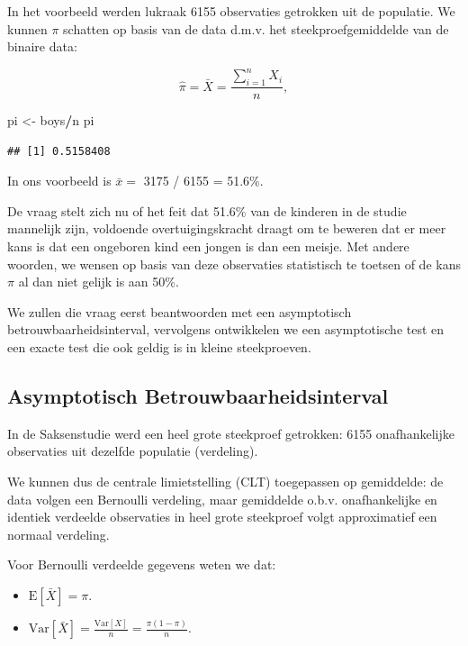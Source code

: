 \documentclass[
  12pt,dutch]{book}
\newenvironment{Shaded}{\begin{snugshade}}{\end{snugshade}}
\newcommand{\NormalTok}[1]{#1}
\newcommand{\OtherTok}[1]{\textcolor[rgb]{0.56,0.35,0.01}{#1}}
\newcommand{\SpecialCharTok}[1]{\textcolor[rgb]{0.81,0.36,0.00}{\textbf{#1}}}
\providecommand{\tightlist}{%
  \setlength{\itemsep}{0pt}\setlength{\parskip}{0pt}}
\theoremstyle{definition}
\theoremstyle{definition}
\theoremstyle{definition}
\theoremstyle{definition}
\theoremstyle{remark}
\begin{document}
In het voorbeeld werden lukraak
6155 observaties getrokken uit de populatie.
We kunnen \(\pi\) schatten op basis van de data d.m.v. het steekproefgemiddelde van de binaire data:

\[\hat \pi = \bar X = \frac{\sum\limits_{i=1}^n X_i}{n},\]

\begin{Shaded}
\begin{Highlighting}[]
\NormalTok{pi }\OtherTok{\textless{}{-}}\NormalTok{ boys}\SpecialCharTok{/}\NormalTok{n}
\NormalTok{pi}
\end{Highlighting}
\end{Shaded}

\begin{verbatim}
## [1] 0.5158408
\end{verbatim}

In ons voorbeeld is \(\bar x =\) 3175 / 6155 = 51.6\%.

De vraag stelt zich nu of het feit dat 51.6\% van de kinderen in de studie mannelijk zijn, voldoende overtuigingskracht draagt om te beweren dat er meer kans is dat een ongeboren kind een jongen is dan een meisje. Met andere woorden, we wensen op basis van deze observaties statistisch te toetsen of de kans \(\pi\) al dan niet gelijk is aan 50\%.

We zullen die vraag eerst beantwoorden met een asymptotisch betrouwbaarheidsinterval, vervolgens ontwikkelen we een asymptotische test en een exacte test die ook geldig is in kleine steekproeven.

\subsection{Asymptotisch Betrouwbaarheidsinterval}\label{asymptotisch-betrouwbaarheidsinterval}

In de Saksenstudie werd een heel grote steekproef getrokken: 6155 onafhankelijke observaties uit dezelfde populatie (verdeling).

We kunnen dus de centrale limietstelling (CLT) toegepassen op gemiddelde:
de data volgen een Bernoulli verdeling, maar gemiddelde o.b.v. onafhankelijke en identiek verdeelde observaties in heel grote steekproef volgt approximatief een normaal verdeling.

Voor Bernoulli verdeelde gegevens weten we dat:

\begin{itemize}
\tightlist
\item
  \(\text{E}[\bar X] = \pi\).
\item
  \(\text{Var}[\bar X] = \frac{\text{Var}[X]}{n} = \frac{\pi(1-\pi)}{n}\).
\end{itemize}
\end{document}
